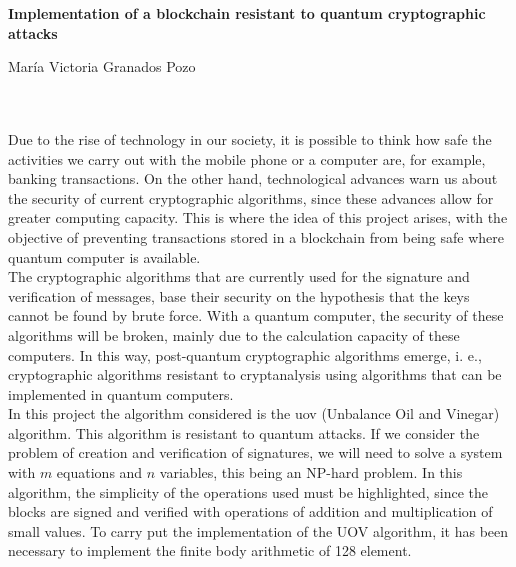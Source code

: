 \cleardoublepage


\thispagestyle{empty}


\begin{center}
{\large\bfseries Implementation of a blockchain resistant to quantum cryptographic attacks}\\
\end{center}
\begin{center}
María Victoria Granados Pozo\\
\end{center}

\\

\vspace{0.7cm}
\\

Due to the rise of technology in our society, it is possible to think how safe the activities we carry out with the mobile phone or a computer are, for example, banking transactions. On the other hand, technological advances warn us about the security of current cryptographic algorithms, since these advances allow for greater computing capacity. This is where the idea of this project arises, with the objective of preventing transactions stored in a blockchain from being safe where quantum computer is available.\\

The cryptographic algorithms that are currently used for the signature and verification of messages, base their security on the hypothesis that the keys cannot be found by brute force. With a quantum computer, the security of these algorithms will be broken, mainly due to the calculation capacity of these computers. In this way, post-quantum cryptographic algorithms emerge, i. e., cryptographic algorithms resistant to cryptanalysis using algorithms that can be implemented in quantum computers.\\

In this project the algorithm considered is the \acrshort{uov} (Unbalance Oil and Vinegar) algorithm. This algorithm is resistant to quantum attacks. If we consider the problem of creation and verification of signatures, we will need to solve a system with $m$ equations and $n$ variables, this being an NP-hard problem. In this algorithm, the simplicity of the operations used must be highlighted, since the blocks are signed and verified with operations of addition and multiplication of small values. To carry put the implementation of the UOV algorithm, it has been necessary to implement the finite body arithmetic of 128 element.\\



